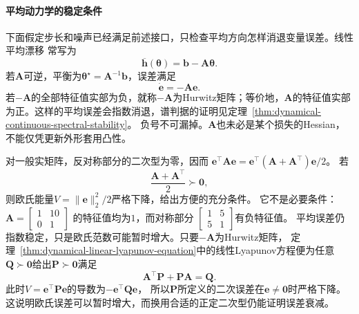 \paragraph{平均动力学的稳定条件}
\label{sec:dynamical-mean-dynamics-linear-recursion}

下面假定步长和噪声已经满足前述接口，只检查平均方向怎样消退变量误差。线性平均漂移
常写为
\begin{equation}
  \overline{\bm h}(\bm\theta)=\bm b-\bm A\bm\theta.
  \label{eq:dynamical-linear-mean-drift}
\end{equation}
若$\bm A$可逆，平衡为$\bm\theta^\star=\bm A^{-1}\bm b$，误差满足
\begin{equation}
  \dot{\bm e}=-\bm A\bm e.
  \label{eq:dynamical-linear-mean-error-ode}
\end{equation}
若\(-\bm A\)的全部特征值实部为负，就称\(-\bm A\)为Hurwitz矩阵；等价地，\(\bm A\)的特征值实部为正。这样的平均误差会指数消退，谱判据的证明见定理~\ref{thm:dynamical-continuous-spectral-stability}。
负号不可漏掉。$\bm A$也未必是某个损失的Hessian，不能仅凭更新外形套用凸性。

对一般实矩阵，反对称部分的二次型为零，因而
$\bm e^\top\bm A\bm e=\bm e^\top(\bm A+\bm A^\top)\bm e/2$。
若
\begin{equation}
  \frac{\bm A+\bm A^\top}{2}\succ\bm0,
  \label{eq:dynamical-positive-symmetric-part}
\end{equation}
则欧氏能量$V=\|\bm e\|_2^2/2$严格下降，给出方便的充分条件。
它不是必要条件：$\bm A=\left[\begin{smallmatrix}1&10\\0&1\end{smallmatrix}\right]$
的特征值均为$1$，而对称部分
$\left[\begin{smallmatrix}1&5\\5&1\end{smallmatrix}\right]$有负特征值。
平均误差仍指数稳定，只是欧氏范数可能暂时增大。只要$-\bm A$为Hurwitz矩阵，
定理~\ref{thm:dynamical-linear-lyapunov-equation}中的线性Lyapunov方程便为任意$\bm Q\succ\bm0$给出$\bm P\succ\bm0$满足
\begin{equation}
  \bm A^\top\bm P+\bm P\bm A=\bm Q.
  \label{eq:dynamical-mean-drift-lyapunov}
\end{equation}
此时$V=\bm e^\top\bm P\bm e$的导数为$-\bm e^\top\bm Q\bm e$，
所以$\bm P$所定义的二次误差在$\bm e\ne\bm0$时严格下降。
这说明欧氏误差可以暂时增大，而换用合适的正定二次型仍能证明误差衰减。

